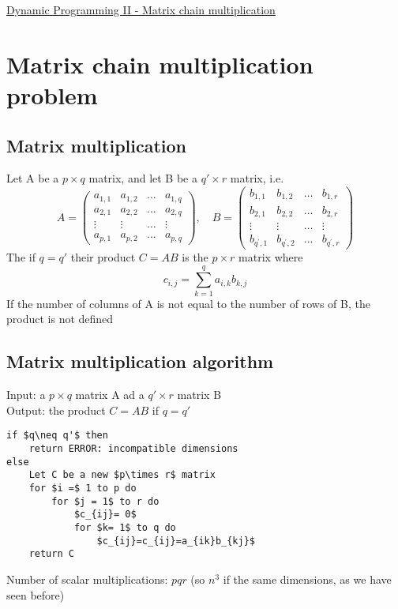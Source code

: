 \documentclass{article}[18pt]
\begin{document}
\begin{center}
\underline{\huge Dynamic Programming II  - Matrix chain multiplication}
\end{center}
\section{Matrix chain multiplication problem}
\subsection{Matrix multiplication}
Let A be a $p\times q$ matrix, and let B be a $q'\times r$ matrix, i.e.
\[
A=\left(\begin{array}{cccc}{a_{1,1}} & {a_{1,2}} & {\dots} & {a_{1, q}} \\ {a_{2,1}} & {a_{2,2}} & {\dots} & {a_{2, q}} \\ {\vdots} & {\vdots} & {\dots} & {\vdots} \\ {a_{p, 1}} & {a_{p, 2}} & {\dots} & {a_{p, q}}\end{array}\right), \quad B=\left(\begin{array}{cccc}{b_{1,1}} & {b_{1,2}} & {\dots} & {b_{1, r}} \\ {b_{2,1}} & {b_{2,2}} & {\dots} & {b_{2, r}} \\ {\vdots} & {\vdots} & {\dots} & {\vdots} \\ {b_{q^{\prime}, 1}} & {b_{q^{\prime}, 2}} & {\dots} & {b_{q^{\prime}, r}}\end{array}\right)
\]
The if $q=q'$ their product $C=AB$ is the $p\times r$ matrix where
\[
c_{i, j}=\sum_{k=1}^{q} a_{i, k} b_{k, j}
\]
If the number of columns of A is not equal to the number of rows of B, the product is not defined
\subsection{Matrix multiplication algorithm}
Input: a $p\times q$ matrix A ad a $q'\times r$ matrix B\\
Output: the product $C=AB$ if $q=q'$
\begin{lstlisting}[caption=Multiply({A,B})]
if $q\neq q'$ then
	return ERROR: incompatible dimensions
else
	Let C be a new $p\times r$ matrix
	for $i =$ 1 to p do
		for $j = 1$ to r do
			$c_{ij}= 0$
			for $k= 1$ to q do
				$c_{ij}=c_{ij}=a_{ik}b_{kj}$
	return C
\end{lstlisting}
Number of scalar multiplications: $pqr$ (so $n^3$ if the same dimensions, as we have seen before)
\end{document}
